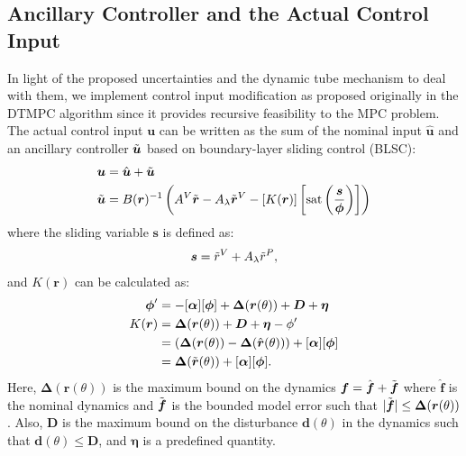 \subsection{Ancillary Controller and the Actual Control Input}
In light of the proposed uncertainties and the dynamic tube mechanism to deal with them, we implement control input modification as proposed originally in the DTMPC algorithm \cite{brett2019dynamic} since it provides recursive feasibility to the MPC problem.
The actual control input $\boldsymbol{u}$ can be written as the sum of the nominal input $\hat{\boldsymbol{u}}$ and an ancillary controller $\Tilde{\boldsymbol{u}}$ based on boundary-layer sliding control (BLSC):
\begin{alignat}{2}
    \boldsymbol{u}&=\hat{\boldsymbol{u}}+\Tilde{\boldsymbol{u}}\\
    \Tilde{\boldsymbol{u}}&=B(\boldsymbol{r})^{-1}\left(A^V\Tilde{\boldsymbol{r}}-A_\lambda\Tilde{\boldsymbol{r}}^V-[K(\boldsymbol{r})]\left[\text{sat}\left(\frac{\boldsymbol{s}}{\boldsymbol{\phi}}\right)\right]\right)
\end{alignat}
where the sliding variable $\boldsymbol{s}$ is defined as:
\begin{alignat}{2}
    \boldsymbol{s}=\Tilde{r}^V+A_\lambda\Tilde{r}^P,
\end{alignat}    
and $K(\boldsymbol{r})$ can be calculated as:
\begin{alignat}{2}
    \boldsymbol{\phi}'&=-[\boldsymbol{\alpha}][\boldsymbol{\phi}]+\boldsymbol{\Delta}(\boldsymbol{r}(\theta))+\boldsymbol{D}+\boldsymbol{\eta}\\
    K(\boldsymbol{r})&=\boldsymbol{\Delta}(\boldsymbol{r}(\theta))+\boldsymbol{D}+\boldsymbol{\eta}-\phi'\\
    &=(\boldsymbol{\Delta}(\boldsymbol{r}(\theta))-\boldsymbol{\Delta}(\hat{\boldsymbol{r}}(\theta)))+[\boldsymbol{\alpha}][\boldsymbol{\phi}]\\
    &=\boldsymbol{\Delta}(\Tilde{\boldsymbol{r}}(\theta))+[\boldsymbol{\alpha}][\boldsymbol{\phi}].\label{eqn:K(r)}
\end{alignat}
Here, $\boldsymbol{\Delta}(\boldsymbol{r}(\theta))$ is the maximum bound on the dynamics $\boldsymbol{f}=\hat{\boldsymbol{f}}+\Tilde{\boldsymbol{f}}$ where $\hat{\boldsymbol{f}}$ is the nominal dynamics and $\Tilde{\boldsymbol{f}}$ is the bounded model error such that $|\Tilde{\boldsymbol{f}}|\leq\boldsymbol{\Delta}(\boldsymbol{r}(\theta))$.
Also, $\boldsymbol{D}$ is the maximum bound on the disturbance $\boldsymbol{d}(\theta)$ in the dynamics such that $\boldsymbol{d}(\theta)\leq\boldsymbol{D}$, and $\boldsymbol{\eta}$ is a predefined quantity.
